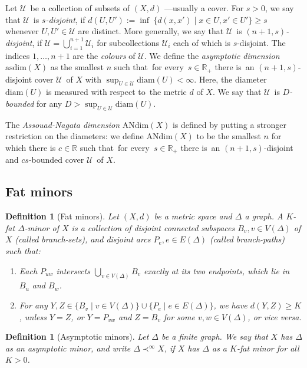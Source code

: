 \documentclass[a4paper]{article}
\newcommand{\defi}[1]{{\color{darkgray}\emph{#1}}}
\newtheorem{definition}[proposition]{Definition}
\newcommand{\R}{\ensuremath{\mathbb R}}
\newcommand{\cu}{\ensuremath{\mathcal U}}
\newcommand{\fe}{for every}
\newcommand{\st}{such that}
\newcommand{\ti}{there is}
\newcommand{\wrt}{with respect to}
\newcommand{\andim}{\ensuremath{\mathrm{ANdim}}}
\newcommand{\diam}{\mathrm{diam}}
\newtheorem{Def}{Definition}
\newcommand{\asdim}{\mathrm{asdim}}
\begin{document}
Let \cu\ be a collection of subsets of $(X,d)$ ---usually a cover. For $s > 0$, we say that \cu\ is \defi{$s$-disjoint}, if
$d(U,U') := \inf\ \{d(x, x') \mid x \in U, x' \in U'\} \geq s$
whenever $U,U'\in \cu$ are distinct. More generally, we say that \cu\ is \defi{$(n+1,s)$-disjoint}, if $\cu = \bigcup_{i=1}^{n+1} \cu_i$ for subcollections $\cu_i$ each of which is $s$-disjoint. The indices $1,\ldots,n+1$ are the \defi{colours} of \cu. We define the \defi{asymptotic dimension} $\asdim(X)$ as the smallest $n$ \st\ \fe\ $s\in \R_+$ \ti\ an $(n+1,s)$-disjoint cover \cu\ of $X$ with $\sup_{U\in \cu} \diam(U)< \infty$. Here, the diameter $\diam(U)$ is measured \wrt\ the metric $d$ of $X$. We say that \cu\ is \defi{$D$-bounded} for any $D> \sup_{U\in \cu} \diam(U)$. 

The \defi{Assouad-Nagata dimension} $\andim(X)$ is defined by putting a stronger restriction on the diameters: we define $\andim(X)$  to be the smallest $n$ for which there is $c\in \R$ \st\ \fe\ $s\in \R_+$ \ti\ an $(n+1,s)$-disjoint and $cs$-bounded cover \cu\ of $X$.


\subsection{Fat minors} \label{sec FM}

\begin{Def}[Fat minors] \label{def fat}
Let $(X,d)$ be a metric space and $\Delta$ a graph. A $K$-\defi{fat} $\Delta$-\defi{minor} of $X$ is a collection of disjoint connected subspaces $B_v, v\in V(\Delta)$ of $X$ (called \defi{branch-sets}), 
and disjoint arcs $P_e,e\in E(\Delta)$ (called \defi{branch-paths}) such that:
\begin{enumerate}
\item \label{fm i} Each  $P_{uw}$ intersects $\bigcup_{v\in V(\Delta)} B_v$ exactly at its two endpoints, which lie in $B_u$ and $B_w$.

\item \label{fm ii} For any $Y,Z \in \{ B_v \mid v\in V(\Delta) \}\cup  \{P_e \mid e\in E(\Delta)\}$, we have $d(Y,Z)\geq K$, unless $Y=Z$, or $Y=P_{vw}$ and $Z=B_v$ for some $v,w\in V(\Delta)$, or vice versa.
\end{enumerate}
\end{Def}

\begin{definition}[Asymptotic minors] \label{def asym}
Let $\Delta$ be a finite graph. We say that $X$ has $\Delta$ as an \defi{asymptotic  minor}, and write $\Delta \prec^\infty X$,  if $X$ has $\Delta $ as a $K$-fat minor  for all $K>0$. \end{definition}
\end{document}

